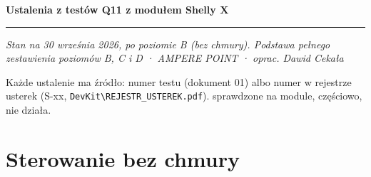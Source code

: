 \documentclass[11pt,a4paper]{article}
\begin{document}
{\LARGE\bfseries Ustalenia z testów Q11 z modułem Shelly X\par}
\vspace{4pt}\textcolor{apteal}{\rule{\textwidth}{1.2pt}}

\emph{Stan na 30 września 2026, po poziomie B (bez chmury). Podstawa pełnego zestawienia poziomów B, C i D · AMPERE POINT · oprac. Dawid Cekała}


Każde ustalenie ma źródło: numer testu (dokument 01) albo numer w rejestrze usterek (S-xx, \texttt{DevKit\textbackslash{}REJESTR\_\allowbreak{}USTEREK.\allowbreak{}pdf}).  sprawdzone na module,  częściowo,  nie działa.


\section*{Sterowanie bez chmury}
\end{document}

